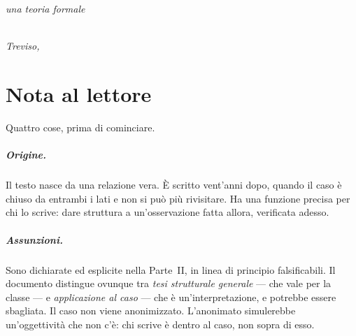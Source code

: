 \documentclass[
    oneside,                 %
    openany,                 %
    titlepage,
    11pt,
    a4paper,
    italian,
    DIV=14,                  %
    headinclude,
    footinclude=true,
    cleardoublepage=empty
]{scrbook}
\theoremstyle{ctplain}
\theoremstyle{ctdef}
\theoremstyle{ctrem}
\begin{document}
\frenchspacing
\raggedbottom
{}
\renewcommand{\partname}{Parte}
\renewcommand{\chaptername}{Capitolo}
\renewcommand{\contentsname}{Indice}
\pagestyle{plain}

\begin{titlepage}
\begin{center}
\vspace*{2cm}

{}\\[3cm]

{\Huge\bfseries{}}\\[1.5cm]

{\Large\itshape una teoria formale}\\[2cm]

\vfill

{\large{}}\\[0.5cm]

{\itshape Treviso, \the\year}

\end{center}
\end{titlepage}

\clearpage

\chapter*{Nota al lettore}

Quattro cose, prima di cominciare.

\paragraph{Origine.} Il testo nasce da una relazione vera. È scritto vent'anni dopo, quando il caso è chiuso da entrambi i lati e non si può più rivisitare. Ha una funzione precisa per chi lo scrive: dare struttura a un'osservazione fatta allora, verificata adesso.

\paragraph{Assunzioni.} Sono dichiarate ed esplicite nella Parte~II, in linea di principio falsificabili. Il documento distingue ovunque tra \emph{tesi strutturale generale} --- che vale per la classe --- e \emph{applicazione al caso} --- che è un'interpretazione, e potrebbe essere sbagliata. Il caso non viene anonimizzato. L'anonimato simulerebbe un'oggettività che non c'è: chi scrive è dentro al caso, non sopra di esso.
\end{document}
